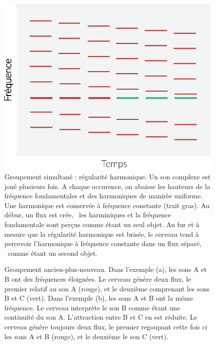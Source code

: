 \begin{figure}[bth]
        \myfloatalign
        \includegraphics[width=.5\linewidth]{gfx/harmo}
        \caption[Groupement simultané : régularité harmonique]{Groupement simultané : régularité harmonique. Un son complexe est joué plusieurs fois. A chaque occurence, on abaisse les hauteurs de la fréquence fondamentales et des harmoniques de manirèe uniforme. Une harmonique est conservée à fréquence constante (trait gras). Au débur, un flux est crée, \ie~les harminiques et la fréquence fondamentale sont perçus comme étant un seul objet. Au fur et à mesure que la régularité harmonique est brisée, le cerveau tend à percevoir l'harmonique à fréquence constante dans un flux séparé, \ie~comme étant un second objet.}\label{fig:harmo}
\end{figure}

\begin{figure}[bth]
        \myfloatalign
        \caption[Groupement ancien-plus-nouveau]{Groupement ancien-plus-nouveau. Dans l'exemple (a), les sons A et B ont des fréquences éloignées. Le cerveau génère deux flux, le premier relatif au son A (rouge), et le deuxième comprenant les sons B et C (vert). Dans l'exemple (b), les sons A et B ont la même fréquence. Le cerveau interprète le son B comme étant une continuité du son A. L'attraction entre B et C en est réduite. Le cerveau génère toujours deux flux, le premier regoupant cette fois ci les sons A et B (rouge), et le deuxième le son C (vert).}\label{fig:oldplusnew}
\end{figure}

